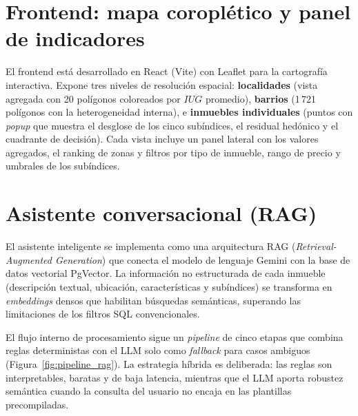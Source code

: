 \documentclass[12pt, a4paper, twoside, openright]{report}
\theoremstyle{plain}
\theoremstyle{definition}
\newcommand{\IUG}{IUG}             %
\begin{document}
\section{Frontend: mapa coroplético y panel de indicadores}

El frontend está desarrollado en React (Vite) con Leaflet para la cartografía interactiva. Expone tres niveles de resolución espacial: \textbf{localidades} (vista agregada con 20 polígonos coloreados por $\IUG$ promedio), \textbf{barrios} (1\,721 polígonos con la heterogeneidad interna), e \textbf{inmuebles individuales} (puntos con \emph{popup} que muestra el desglose de los cinco subíndices, el residual hedónico y el cuadrante de decisión). Cada vista incluye un panel lateral con los valores agregados, el ranking de zonas y filtros por tipo de inmueble, rango de precio y umbrales de los subíndices.

\section{Asistente conversacional (RAG)}

El asistente inteligente se implementa como una arquitectura RAG (\emph{Retrieval-Augmented Generation}) que conecta el modelo de lenguaje Gemini con la base de datos vectorial PgVector. La información no estructurada de cada inmueble (descripción textual, ubicación, características y subíndices) se transforma en \emph{embeddings} densos que habilitan búsquedas semánticas, superando las limitaciones de los filtros SQL convencionales.

El flujo interno de procesamiento sigue un \emph{pipeline} de cinco etapas que combina reglas deterministas con el LLM solo como \emph{fallback} para casos ambiguos (Figura~\ref{fig:pipeline_rag}). La estrategia híbrida es deliberada: las reglas son interpretables, baratas y de baja latencia, mientras que el LLM aporta robustez semántica cuando la consulta del usuario no encaja en las plantillas precompiladas.
\end{document}
